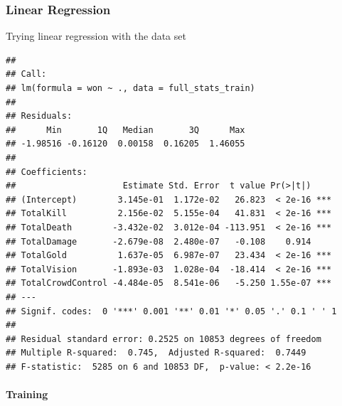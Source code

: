\documentclass[
]{article}
\newenvironment{Shaded}{\begin{snugshade}}{\end{snugshade}}
\newcommand{\AttributeTok}[1]{\textcolor[rgb]{0.77,0.63,0.00}{#1}}
\newcommand{\DecValTok}[1]{\textcolor[rgb]{0.00,0.00,0.81}{#1}}
\newcommand{\FunctionTok}[1]{\textcolor[rgb]{0.00,0.00,0.00}{#1}}
\newcommand{\NormalTok}[1]{#1}
\newcommand{\OtherTok}[1]{\textcolor[rgb]{0.56,0.35,0.01}{#1}}
\newcommand{\SpecialCharTok}[1]{\textcolor[rgb]{0.00,0.00,0.00}{#1}}
\begin{document}
\hypertarget{linear-regression}{%
\subsubsection{Linear Regression}\label{linear-regression}}

Trying linear regression with the data set

\begin{Shaded}
\end{Shaded}

\begin{verbatim}
## 
## Call:
## lm(formula = won ~ ., data = full_stats_train)
## 
## Residuals:
##      Min       1Q   Median       3Q      Max 
## -1.98516 -0.16120  0.00158  0.16205  1.46055 
## 
## Coefficients:
##                     Estimate Std. Error  t value Pr(>|t|)    
## (Intercept)        3.145e-01  1.172e-02   26.823  < 2e-16 ***
## TotalKill          2.156e-02  5.155e-04   41.831  < 2e-16 ***
## TotalDeath        -3.432e-02  3.012e-04 -113.951  < 2e-16 ***
## TotalDamage       -2.679e-08  2.480e-07   -0.108    0.914    
## TotalGold          1.637e-05  6.987e-07   23.434  < 2e-16 ***
## TotalVision       -1.893e-03  1.028e-04  -18.414  < 2e-16 ***
## TotalCrowdControl -4.484e-05  8.541e-06   -5.250 1.55e-07 ***
## ---
## Signif. codes:  0 '***' 0.001 '**' 0.01 '*' 0.05 '.' 0.1 ' ' 1
## 
## Residual standard error: 0.2525 on 10853 degrees of freedom
## Multiple R-squared:  0.745,  Adjusted R-squared:  0.7449 
## F-statistic:  5285 on 6 and 10853 DF,  p-value: < 2.2e-16
\end{verbatim}

\hypertarget{training}{%
\paragraph{Training}\label{training}}
\end{document}
